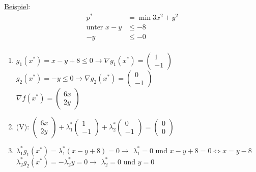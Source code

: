 \underline{Beispiel}:
\begin{align*}
    p^* &= \min 3x^2 + y^2\\
    \text{unter } x - y &\leq -8\\
    -y &\leq -0\\
\end{align*}

\begin{enumerate}
    \item \(g_1(x^*)=x-y+8 \leq 0 \rightarrow \nabla g_1(x^*) = \begin{pmatrix}
        1\\-1
    \end{pmatrix}\)\\
    \(g_2(x^*)=-y \leq 0 \rightarrow \nabla g_2(x^*) = \begin{pmatrix}
        0\\-1
    \end{pmatrix}\)\\
    \(\nabla f(x^*) = \begin{pmatrix}
        6x\\2y
    \end{pmatrix}\)\\

    \item (V): \(\begin{pmatrix}
        6x\\2y
    \end{pmatrix} + \lambda_1^* \begin{pmatrix}
        1\\-1
    \end{pmatrix} + \lambda_2^* \begin{pmatrix}
        0\\-1
    \end{pmatrix} = \begin{pmatrix}
        0\\0
    \end{pmatrix}\)\\

    \item \(\lambda_1^* g_1(x^*) = \lambda_1^*(x-y+8)=0 \rightarrow\) \underline{\(\lambda_1^*=0\)} und \(x-y+8=0 \Leftrightarrow \)\underline{\(x = y-8\)}\\
          \(\lambda_2^* g_2(x^*) = -\lambda_2^* y = 0 \rightarrow\) \underline{\(\lambda_2^*=0\)} und \underline{\(y=0\)}\\
    
    
\end{enumerate}